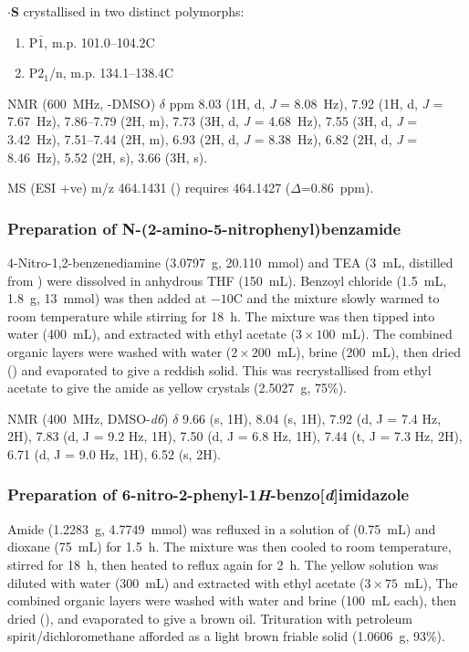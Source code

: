 \begin{refsection}
$\cdot$\textbf{S} crystallised in two distinct polymorphs:
\begin{enumerate}
    \item P$\bar{1}$, m.p. 101.0--104.2\degree{}C
    \item P$2_1$/n, m.p. 134.1--138.4\degree{}C
\end{enumerate}

 NMR (600~MHz, -DMSO) $\delta$ ppm 8.03 (1H, d, \emph{J} = 8.08~Hz), 7.92 (1H, d, \emph{J} = 7.67~Hz), 7.86--7.79 (2H, m), 7.73 (3H, d, \emph{J} = 4.68~Hz), 7.55 (3H, d, \emph{J} = 3.42~Hz), 7.51--7.44 (2H, m), 6.93 (2H, d, \emph{J} = 8.38~Hz), 6.82 (2H, d, \emph{J} = 8.46~Hz), 5.52 (2H, s), 3.66 (3H, s).

MS (ESI +ve) m/z 464.1431 ()  requires 464.1427 ($\Delta$=0.86~ppm).

\subsubsection[Preparation of \refcmpd{rhs-nitro-amide}]{Preparation of N-(2-amino-5-nitrophenyl)benzamide }
4-Nitro-1,2-benzenediamine (3.0797~g, 20.110~mmol) and TEA (3~mL, distilled from ) were dissolved in anhydrous THF (150~mL).
Benzoyl chloride (1.5~mL, 1.8~g, 13~mmol) was then added at $-10$\degree{}C and the mixture slowly warmed to room temperature while stirring for 18~h.
The mixture was then tipped into water (400~mL), and extracted with ethyl acetate ($3\times100$~mL).
The combined organic layers were washed with water ($2\times200$~mL), brine (200~mL), then dried () and evaporated to give a reddish solid.
This was recrystallised from ethyl acetate to give the amide  as yellow crystals (2.5027~g, 75\%).

 NMR (400~MHz, DMSO-\emph{d6}) $\delta$ 9.66 (s, 1H), 8.04 (s, 1H), 7.92 (d, J = 7.4 Hz, 2H), 7.83 (d, J = 9.2 Hz, 1H), 7.50 (d, J = 6.8 Hz, 1H), 7.44 (t, J = 7.3 Hz, 2H), 6.71 (d, J = 9.0 Hz, 1H), 6.52 (s, 2H).

\subsubsection[Preparation of \refcmpd{rhs-nitro}]{Preparation of 6-nitro-2-phenyl-1\emph{H}-benzo[\emph{d}]imidazole }
Amide  (1.2283~g, 4.7749~mmol) was refluxed in a solution of  (0.75~mL) and dioxane (75~mL) for 1.5~h.
The mixture was then cooled to room temperature, stirred for 18~h, then heated to reflux again for 2~h.
The yellow solution was diluted with water (300~mL) and extracted with ethyl acetate ($3\times75$~mL),
The combined organic layers were washed with water and brine (100~mL each), then dried (), and evaporated to give a brown oil.
Trituration with petroleum spirit/dichloromethane afforded  as a light brown friable solid (1.0606~g, 93\%).


\end{refsection}

